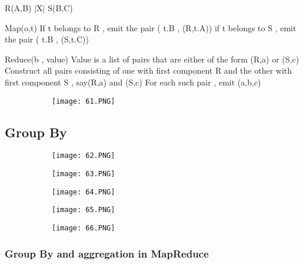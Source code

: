 \documentclass{article}
\begin{document}
R(A,B) $|$X$|$ S(B,C)

Map(o,t)
If t belongs to R , emit the pair ( t.B , (R,t.A))
if t belongs to S , emit the pair ( t.B , (S,t.C))

Reduce(b , value)
Value is a list of pairs that are either of the form (R,a) or (S,c)
Construct all pairs consisting of one with first component R and the other with first component S , say(R,a) and (S,c)
For each such pair , emit (a,b,c)

\begin{figure}[ht!]
  \centering
  \begin{subfigure}[b]{0.5\linewidth}
    \texttt{[image: 61.PNG]}
  \end{subfigure}
\end{figure}

\subsection{Group By}

\begin{figure}[ht!]
  \centering
  \begin{subfigure}[b]{0.5\linewidth}
    \texttt{[image: 62.PNG]}
  \end{subfigure}
     \begin{subfigure}[b]{0.4\textwidth}
         \centering
         \texttt{[image: 63.PNG]}
     \end{subfigure}
\end{figure}


\begin{figure}[ht!]
  \centering
  \begin{subfigure}[b]{0.5\linewidth}
    \texttt{[image: 64.PNG]}
  \end{subfigure}
     \begin{subfigure}[b]{0.4\textwidth}
         \centering
         \texttt{[image: 65.PNG]}
     \end{subfigure}
\end{figure}

\begin{figure}[ht!]
  \centering
  \begin{subfigure}[b]{0.5\linewidth}
    \texttt{[image: 66.PNG]}
  \end{subfigure}
\end{figure}


\subsubsection{Group By and aggregation in MapReduce}
\end{document}

